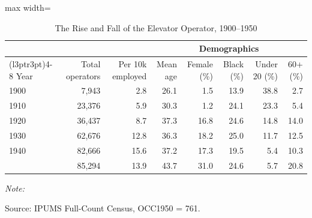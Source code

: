 \begin{table}[!h]
\centering
\caption{The Rise and Fall of the Elevator Operator, 1900--1950}
\label{tab:national_summary}
\begin{adjustbox}{max width=\textwidth}
\begin{threeparttable}
\begin{tabular}[t]{lrrrrrrr}
\toprule
\multicolumn{3}{c}{ } & \multicolumn{5}{c}{Demographics} \\
\cmidrule(l{3pt}r{3pt}){4-8}
Year & Total operators & Per 10k employed & Mean age & Female (\%) & Black (\%) & Under 20 (\%) & 60+ (\%)\\
\midrule
1900 & 7,943 & 2.8 & 26.1 & 1.5 & 13.9 & 38.8 & 2.7\\
1910 & 23,376 & 5.9 & 30.3 & 1.2 & 24.1 & 23.3 & 5.4\\
1920 & 36,437 & 8.7 & 37.3 & 16.8 & 24.6 & 14.8 & 14.0\\
1930 & 62,676 & 12.8 & 36.3 & 18.2 & 25.0 & 11.7 & 12.5\\
1940 & 82,666 & 15.6 & 37.2 & 17.3 & 19.5 & 5.4 & 10.3\\
\addlinespace
1950 & 85,294 & 13.9 & 43.7 & 31.0 & 24.6 & 5.7 & 20.8\\
\bottomrule
\end{tabular}
\begin{tablenotes}
\item \textit{Note: } 
\item Source: IPUMS Full-Count Census, OCC1950 = 761.
\end{tablenotes}
\end{threeparttable}
\end{adjustbox}
\end{table}
